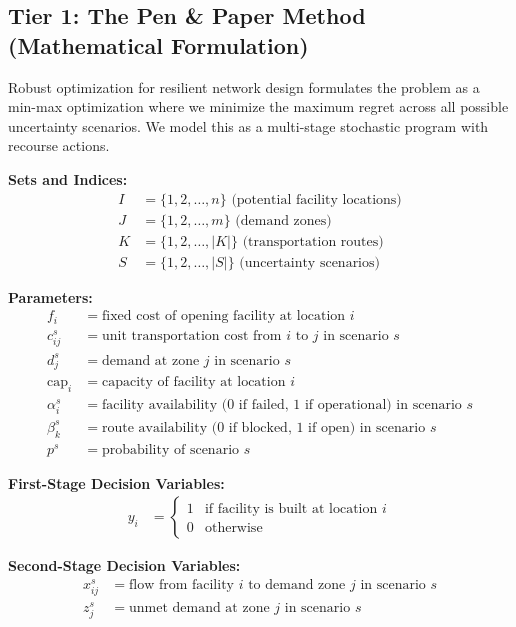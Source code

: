 \documentclass{article}
\begin{document}
\subsection{Tier 1: The Pen \& Paper Method (Mathematical Formulation)}

Robust optimization for resilient network design formulates the problem as a min-max optimization where we minimize the maximum regret across all possible uncertainty scenarios. We model this as a multi-stage stochastic program with recourse actions.

\textbf{Sets and Indices:}
\begin{align}
I &= \{1, 2, \ldots, n\} \text{ (potential facility locations)} \\
J &= \{1, 2, \ldots, m\} \text{ (demand zones)} \\
K &= \{1, 2, \ldots, |K|\} \text{ (transportation routes)} \\
S &= \{1, 2, \ldots, |S|\} \text{ (uncertainty scenarios)}
\end{align}

\textbf{Parameters:}
\begin{align}
f_i &= \text{fixed cost of opening facility at location } i \\
c_{ij}^s &= \text{unit transportation cost from } i \text{ to } j \text{ in scenario } s \\
d_j^s &= \text{demand at zone } j \text{ in scenario } s \\
\text{cap}_i &= \text{capacity of facility at location } i \\
\alpha_i^s &= \text{facility availability (0 if failed, 1 if operational) in scenario } s \\
\beta_k^s &= \text{route availability (0 if blocked, 1 if open) in scenario } s \\
p^s &= \text{probability of scenario } s
\end{align}

\textbf{First-Stage Decision Variables:}
\begin{align}
y_i &= \begin{cases} 1 & \text{if facility is built at location } i \\ 0 & \text{otherwise} \end{cases}
\end{align}

\textbf{Second-Stage Decision Variables:}
\begin{align}
x_{ij}^s &= \text{flow from facility } i \text{ to demand zone } j \text{ in scenario } s \\
z_j^s &= \text{unmet demand at zone } j \text{ in scenario } s
\end{align}
\end{document}
